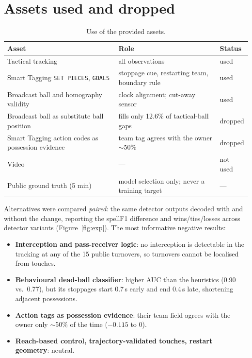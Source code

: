 \documentclass[10pt,a4paper]{article}
\newcommand{\code}[1]{\texttt{#1}}
\begin{document}
\section{Assets used and dropped}

\begin{table}[H]
\centering\small
\caption{Use of the provided assets.}
\label{tab:assets}
\begin{tabularx}{\linewidth}{@{}lXl@{}}
\toprule
Asset & Role & Status\\
\midrule
Tactical tracking & all observations & used\\
Smart Tagging \code{SET PIECES}, \code{GOALS} & stoppage cue, restarting team, boundary rule & used\\
Broadcast ball and homography validity & clock alignment; cut-away sensor & used\\
Broadcast ball as substitute ball position & fills only 12.6\% of tactical-ball gaps & dropped\\
Smart Tagging action codes as possession evidence & team tag agrees with the owner $\sim$50\% & dropped\\
Video & --- & not used\\
Public ground truth (5 min) & model selection only; never a training target & ---\\
\bottomrule
\end{tabularx}
\end{table}

Alternatives were compared \emph{paired}: the same detector outputs decoded with and without the
change, reporting the spellF1 difference and wins/ties/losses across detector variants
(Figure~\ref{fig:exp}). The most informative negative results:
\begin{itemize}
\item \textbf{Interception and pass-receiver logic}: no interception is detectable in the tracking at
  any of the 15 public turnovers, so turnovers cannot be localised from touches.
\item \textbf{Behavioural dead-ball classifier}: higher AUC than the heuristics (0.90 vs.\ 0.77), but
  its stoppages start 0.7\,s early and end 0.4\,s late, shortening adjacent possessions.
\item \textbf{Action tags as possession evidence}: their team field agrees with the owner only
  $\sim$50\% of the time ($-0.115$ to $0$).
\item \textbf{Reach-based control, trajectory-validated touches, restart geometry}: neutral.
\end{itemize}
\end{document}
